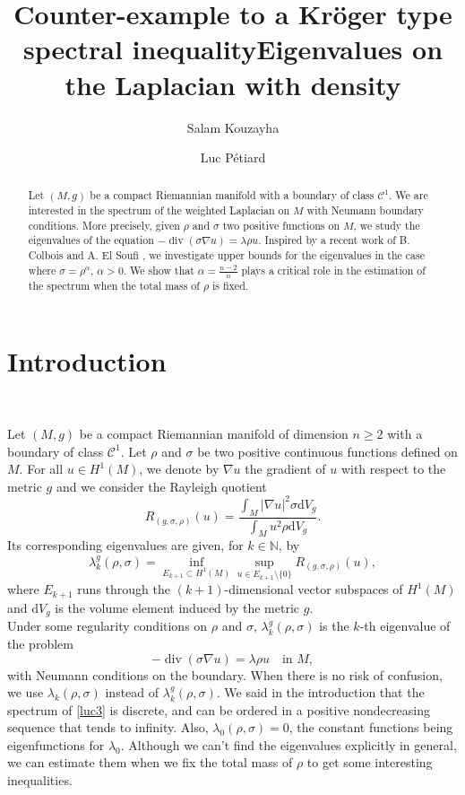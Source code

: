 \documentclass[12pt,reqno]{amsart}		%
\title{Counter-example to a Kröger type spectral inequality}
\author{Salam Kouzayha \and Luc Pétiard}
\date{}
\title{Eigenvalues on the Laplacian with density}
\theoremstyle{plain}
\theoremstyle{definition}
\theoremstyle{remark}
\numberwithin{equation}{section}
\newcommand{\N}{\mathbb{N}}
\renewcommand{\d}{\mathrm{d}}
\renewcommand{\div}{\operatorname{div}}
\begin{document}
\begin{abstract}
Let $(M,g)$ be a compact Riemannian manifold with a boundary of class $\mathscr{C}^{1}$. We are interested in the spectrum of the weighted Laplacian on $M$ with Neumann boundary conditions. More precisely, given $\rho$ and $\sigma$ two positive functions on $M$, we study the eigenvalues of the equation $-\div(\sigma \nabla u)=\lambda\rho u$. Inspired by a recent work of B. Colbois and A. El Soufi \cite{colbois_soufi_2019}, we investigate upper bounds for the eigenvalues in the case where $\sigma=\rho^{\alpha}$, $\alpha>0$. We show that $\alpha = \frac{n-2}{n}$ plays a critical role in the estimation of the spectrum when the total mass of $\rho$ is fixed.
\end{abstract}

\maketitle


\section{Introduction}\ %

Let $(M,g)$ be a compact Riemannian manifold of dimension $n\geqslant2$ with a boundary of class $\mathscr{C}^{1}$. Let $\rho$ and $\sigma$ be two positive continuous functions defined on $M$. For all $u\in H^{1}(M)$, we denote by $\nabla u$ the gradient of $u$ with respect to the metric $g$ and we consider the Rayleigh quotient
\begin{equation}
\label{variationnel}
R_{(g,\sigma,\rho)}(u)=\frac{\int_{M}|\nabla u|^{2}\sigma \d V_{g}}{\int_{M}u^{2}\rho \d V_{g}}.
\end{equation}
 Its corresponding eigenvalues are given, for $k \in \N$, by
\[
\lambda_{k}^{g}(\rho,\sigma)=\inf\limits_{E_{k+1}\subset H^1(M)}\sup_{u\in E_{k+1}\setminus \{0\}}R_{(g,\sigma,\rho)}(u),
\]
where $E_{k+1}$ runs through the $(k+1)$-dimensional vector subspaces of $H^{1}(M)$ and $\d V_{g}$ is the volume element induced by the metric $g$.\\
Under some regularity conditions on $\rho$ and $\sigma$, $\lambda^{g}_{k}(\rho,\sigma)$ is the $k$-th eigenvalue of the problem
\begin{equation}
\label{luc3}
-\div(\sigma \nabla u)=\lambda\rho u\quad \text{in } M,
\end{equation}
with Neumann conditions on the boundary. 
When there is no risk of confusion, we use $\lambda_{k}(\rho,\sigma)$ instead of $\lambda_{k}^{g}(\rho,\sigma)$.
We said in the introduction that the spectrum of \eqref{luc3} is discrete, and can be ordered in a positive nondecreasing sequence that tends to infinity. Also, $\lambda_{0}(\rho,\sigma)=0$, the constant functions being eigenfunctions for $\lambda_{0}$. Although we can't find the eigenvalues explicitly in general, we can estimate them when we fix the total mass of $\rho$ to get some interesting inequalities.
\end{document}
